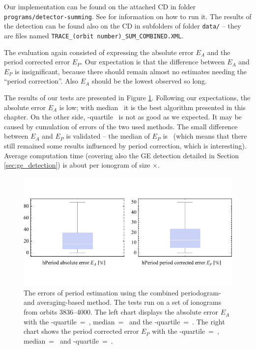 Our implementation can be found on the attached CD in folder \texttt{programs/detector-summing}. See  for information on how to run it. The results of the detection can be found also on the CD in subfolders of folder \texttt{data/} -- they are files named \texttt{TRACE\_(orbit number)\_SUM\_COMBINED.XML}.

The evaluation again consisted of expressing the absolute error $E_A$ and the period corrected error $E_P$. Our expectation is that the difference between $E_A$ and $E_P$ is insignificant, because there should remain almost no estimates needing the ``period correction''. Also $E_A$ should be the lowest observed so long.

The results of our tests are presented in Figure \ref{fig:combined_errors}. Following our expectations, the absolute error $E_A$ is low; with median~ it is the best algorithm presented in this chapter. On the other side, \mbox{}-quartile~ is not as good as we expected. It may be caused by cumulation of errors of the two used methods. The small difference between $E_A$ and $E_P$ is validated -- the median of $E_P$ is~ (which means that there still remained some results influenced by period correction, which is interesting). Average computation time (covering also the GE detection detailed in Section \ref{sec:ge_detection}) is about  per ionogram of size $\times$.

\begin{figure}
	\centering
	\includegraphics[width=140mm]{images/combined_errors.pdf}
	\caption{The errors of period estimation using the combined periodogram- and averaging-based method. The tests run on a set of ionograms from orbits 3836--4000. The left chart displays the absolute error $E_A$ with the \mbox{-quartile}~=~, median~=~ and the \mbox{-quartile}~=~. The right chart shows the period corrected error $E_P$ with the \mbox{-quartile}~=~, median~=~ and \mbox{-quartile}~=~.}
	\label{fig:combined_errors}
\end{figure}

